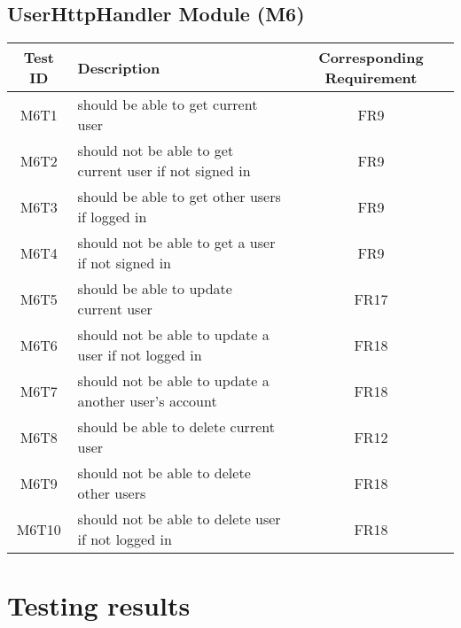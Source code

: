 \documentclass[fullpage]{article}
\begin{document}
\subsection{UserHttpHandler Module (M6)}
\begin{table}[H]
\flushleft
\begin{tabular}{|c|p{8.5cm}|c|}
\hline
 \rowcolor{lightgray} 
\textbf{Test ID} &\textbf{Description} &\textbf{Corresponding Requirement}\\
\hline
M6T1 & should be able to get current user & FR9 \\
\hline
M6T2 & should not be able to get current user if not signed in & FR9 \\
\hline
M6T3 & should be able to get other users if logged in & FR9 \\
\hline
M6T4 & should not be able to get a user if not signed in & FR9 \\
\hline
M6T5 & should be able to update current user & FR17 \\
\hline
M6T6 & should not be able to update a user if not logged in & FR18 \\
\hline
M6T7 & should not be able to update a another user's account & FR18 \\
\hline
M6T8 & should be able to delete current user & FR12 \\
\hline
M6T9 & should not be able to delete other users & FR18 \\
\hline
M6T10 & should not be able to delete user if not logged in & FR18 \\
\hline
\end{tabular}
\end{table}


\section{Testing results}
\end{document}
